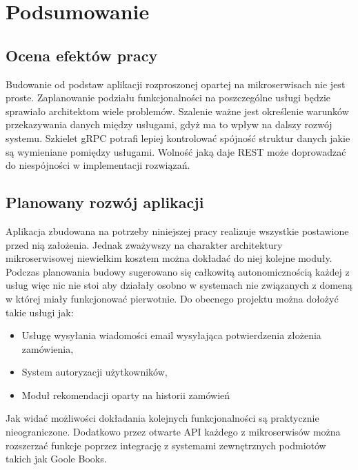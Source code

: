 \chapter{Podsumowanie}
\section{Ocena efektów pracy}
\par Budowanie od podstaw aplikacji rozproszonej opartej na mikroserwisach nie jest proste. Zaplanowanie podziału funkcjonalności na poszczególne usługi będzie sprawiało architektom wiele problemów. Szalenie ważne jest określenie warunków przekazywania danych między usługami, gdyż ma to wpływ na dalszy rozwój systemu. Szkielet gRPC potrafi lepiej kontrolować spójność struktur danych jakie są wymieniane pomiędzy usługami. Wolność jaką daje REST może doprowadzać do niespójności w implementacji rozwiązań. 
\section{Planowany rozwój aplikacji}
\par Aplikacja zbudowana na potrzeby niniejszej pracy realizuje wszystkie postawione przed nią założenia. Jednak zważywszy na charakter architektury mikroserwisowej niewielkim kosztem można dokładać do niej kolejne moduły. Podczas planowania budowy sugerowano się całkowitą autonomicznością każdej z usług więc nic nie stoi aby działały osobno w systemach nie związanych z domeną w której miały funkcjonować pierwotnie. Do obecnego projektu można dołożyć takie usługi jak:
\begin{itemize}
    \item Usługę wysyłania wiadomości email wysyłająca potwierdzenia złożenia zamówienia,
    \item System autoryzacji użytkowników,
    \item Moduł rekomendacji oparty na historii zamówień
\end{itemize}
Jak widać możliwości dokładania kolejnych funkcjonalności są praktycznie nieograniczone. Dodatkowo przez otwarte API każdego z mikroserwisów można rozszerzać funkcje poprzez integrację z systemami zewnętrznych podmiotów takich jak Goole Books.

